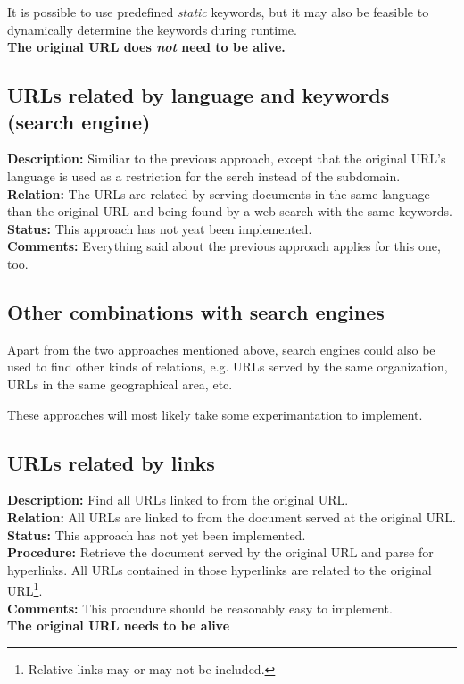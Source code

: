 \documentclass[a4paper]{danarticle}
\begin{document}
      It is possible to use predefined \textit{static} keywords, but it may
      also be feasible to dynamically determine the keywords during runtime.
      \\
      \textbf{The original URL does \textit{not} need to be alive.}
    \subsection*{URLs related by language and keywords (search engine)}
      \textbf{Description:} Similiar to the previous approach, except that 
      the original URL's language is used as a restriction for the serch
      instead of the subdomain.
      \\
      \textbf{Relation:} The URLs are related by serving documents
      in the same language than the original URL and being found by
      a web search with the same keywords.
      \\
      \textbf{Status:} This approach has not yeat been implemented.
      \\
      \textbf{Comments:} Everything said about the previous approach 
      applies for this one, too.
    \subsection*{Other combinations with search engines}
      Apart from the two approaches mentioned above, search engines could
      also be used to find other kinds of relations, e.g. URLs served
      by the same organization, URLs in the same geographical area, etc.
      
      These approaches will most likely take some experimantation to
      implement.
    \subsection*{URLs related by links}
      \textbf{Description:} Find all URLs linked to from the original URL.
      \\
      \textbf{Relation:} All URLs are linked to from the document served at
      the original URL.
      \\
      \textbf{Status:} This approach has not yet been implemented.
      \\
      \textbf{Procedure:} Retrieve the document served by the original
      URL and parse for hyperlinks. All URLs contained in those hyperlinks
      are related to the original URL\footnote{Relative links may or may
      not be included.}.
      \\
      \textbf{Comments:} This procudure should be reasonably easy to implement.
      \\
      \textbf{The original URL needs to be alive}
\end{document}
